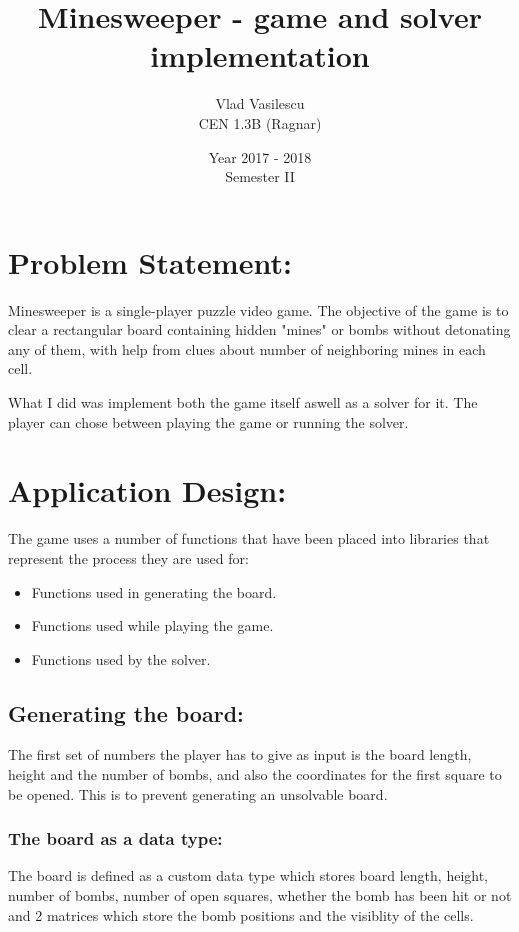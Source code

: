 \documentclass{report}
\title{Minesweeper - game and solver implementation}
\author{Vlad Vasilescu \\ CEN 1.3B (Ragnar)}
\date{Year 2017 - 2018 \\ Semester II}
\begin{document}
\begin{titlepage}
\maketitle
\end{titlepage}

\chapter*{Problem Statement:}
Minesweeper is a single-player puzzle video game. The objective of the game is to clear a rectangular board containing hidden "mines"
or bombs without detonating any of them, with help from clues about number of neighboring mines in each cell.

What I did was implement both the game itself aswell as a solver for it. The player can chose between playing the game or running the
solver.

\chapter*{Application Design:}
The game uses a number of functions that have been placed into libraries that represent the process they are used for:
\begin{itemize}
    \item Functions used in generating the board.
    \item Functions used while playing the game.
    \item Functions used by the solver.
\end{itemize}

\section*{Generating the board:}
The first set of numbers the player has to give as input is the board length, height and the number of bombs, and also the coordinates for the
first square to be opened. This is to prevent generating an unsolvable board.

\subsection*{The board as a data type:}
The board is defined as a custom data type which stores board length, height, number of bombs, number of open squares, whether the bomb has been
hit or not and 2 matrices which store the bomb positions and the visiblity of the cells.
\end{document}
